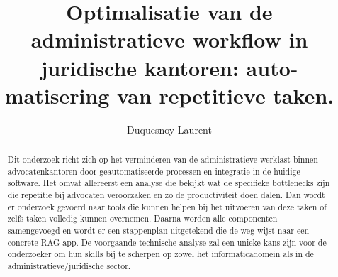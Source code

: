 \documentclass[a0,portrait]{hogent-poster}
\title{Optimalisatie van de administratieve
workflow in juridische kantoren: auto-
matisering van repetitieve taken.}
\author{Duquesnoy Laurent}
\begin{document}
\maketitle

\begin{abstract}
	Dit onderzoek richt zich op het verminderen van de administratieve werklast binnen advocatenkantoren door geautomatiseerde processen en integratie in de huidige software.
	Het omvat allereerst een analyse die bekijkt wat de specifieke bottlenecks zijn die repetitie bij advocaten veroorzaken en zo de productiviteit doen dalen.
	Dan wordt er onderzoek gevoerd naar tools die kunnen helpen bij het uitvoeren van deze taken of zelfs taken volledig kunnen overnemen.
	Daarna worden alle componenten samengevoegd en wordt er een stappenplan uitgetekend die de weg wijst naar een concrete RAG app.
	De voorgaande technische analyse zal een unieke kans zijn voor de onderzoeker om hun skills bij te scherpen op zowel het informaticadomein als in de administratieve/juridische sector.
\end{abstract}
\end{document}
